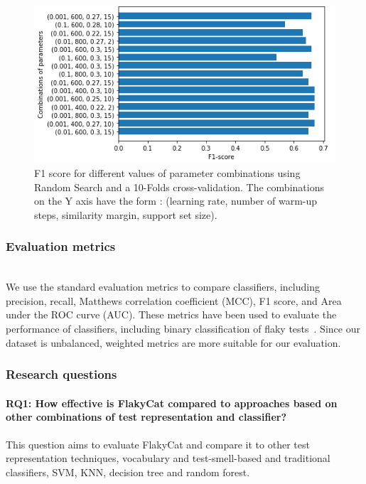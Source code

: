 \begin{figure}[htbp]
\centering
\includegraphics[scale=0.7]{figures/flakycat/parameters.PNG}
\caption{F1 score for different values of parameter combinations using Random Search and a 10-Folds cross-validation. The combinations on the Y axis have the form : (learning rate, number of warm-up steps, similarity margin, support set size). }
\label{fig:parameters}
\end{figure}



\subsubsection{Evaluation metrics}
~~ \\
We use the standard evaluation metrics to compare classifiers, including precision, recall, Matthews correlation coefficient (MCC), F1 score, and Area under the ROC curve (AUC).
These metrics have been used to evaluate the performance of classifiers, including binary classification of flaky tests~\cite{pinto2020vocabulary,camara2021use,fatima2021flakify}.
Since our dataset is unbalanced, weighted metrics are more suitable for our evaluation. 


\subsubsection{Research questions}
\paragraph{  \textbf {RQ1: How effective is FlakyCat compared to approaches based on other combinations of test representation and classifier?}}

This question aims to evaluate FlakyCat and compare it to other test representation techniques, \ie vocabulary and test-smell-based and traditional classifiers, \ie SVM, KNN, decision tree and random forest.

